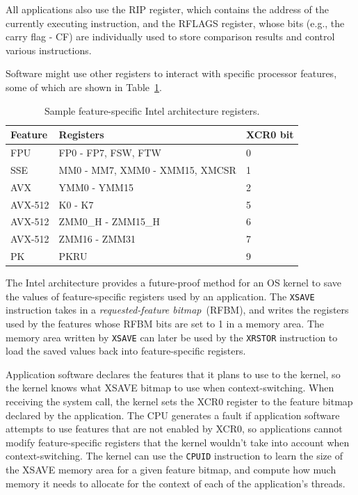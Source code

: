 All applications also use the RIP register, which contains the address of the
currently executing instruction, and the RFLAGS register, whose bits (e.g.,
the carry flag - CF) are individually used to store comparison results and
control various instructions.


Software might use other registers to interact with specific processor
features, some of which are shown in Table~\ref{fig:xsave_state}.

\begin{table}[hbt]
  \centering
  \begin{tabularx}{\columnwidth}{| l | X | l |}
  \hline
  \textbf{Feature} & \textbf{Registers} & \textbf{XCR0 bit}\\
  \hline
  FPU & FP0 - FP7, FSW, FTW & 0 \\
  \hline
  SSE & MM0 - MM7, XMM0 - XMM15, XMCSR & 1 \\
  \hline
  AVX & YMM0 - YMM15 & 2 \\
  \hline
  AVX-512 & K0 - K7 & 5 \\
  \hline
  AVX-512 & ZMM0\_H  - ZMM15\_H & 6 \\
  \hline
  AVX-512 & ZMM16 - ZMM31 & 7 \\
  \hline
  PK & PKRU & 9 \\
  \hline
  \end{tabularx}
  \caption{Sample feature-specific Intel architecture registers.}
  \label{fig:xsave_state}
\end{table}

The Intel architecture provides a future-proof method for an OS kernel to save
the values of feature-specific registers used by an application. The
\texttt{XSAVE} instruction takes in a \textit{requested-feature bitmap}~(RFBM),
and writes the registers used by the features whose RFBM bits are set to 1 in a
memory area. The memory area written by \texttt{XSAVE} can later be used by the
\texttt{XRSTOR} instruction to load the saved values back into feature-specific
registers.

Application software declares the features that it plans to use to the kernel,
so the kernel knows what XSAVE bitmap to use when context-switching. When
receiving the system call, the kernel sets the XCR0 register to the feature
bitmap declared by the application. The CPU generates a fault if application
software attempts to use features that are not enabled by XCR0, so applications
cannot modify feature-specific registers that the kernel wouldn't take into
account when context-switching. The kernel can use the \texttt{CPUID}
instruction to learn the size of the XSAVE memory area for a given feature
bitmap, and compute how much memory it needs to allocate for the context of
each of the application's threads.
